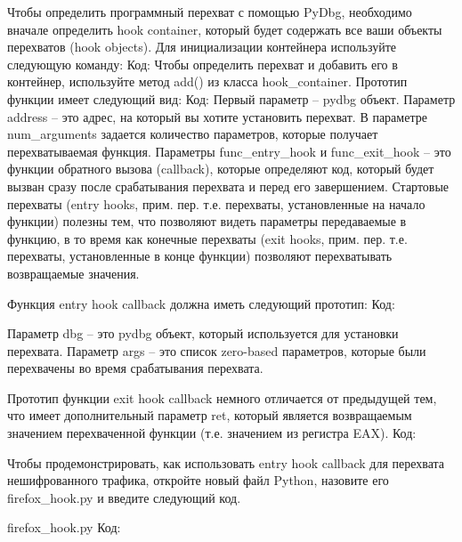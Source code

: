 \documentclass[12pt, a4paper, oneside]{book}
\begin{document}
Чтобы определить программный перехват с помощью PyDbg, необходимо вначале определить hook container, который будет содержать все ваши объекты перехватов (hook objects). Для инициализации контейнера используйте следующую команду:
Код:
Чтобы определить перехват и добавить его в контейнер, используйте метод add() из класса hook\_container. Прототип функции имеет следующий вид:
Код:
Первый параметр – pydbg объект. Параметр address – это адрес, на который вы хотите установить перехват. В параметре num\_arguments задается количество параметров, которые получает перехватываемая функция. Параметры func\_entry\_hook и func\_exit\_hook – это функции обратного вызова (callback), которые определяют код, который будет вызван сразу после срабатывания перехвата и перед его завершением. Стартовые перехваты (entry hooks, прим. пер. т.е. перехваты, установленные на начало функции) полезны тем, что позволяют видеть параметры передаваемые в функцию, в то время как конечные перехваты (exit hooks, прим. пер. т.е. перехваты, установленные в конце функции) позволяют перехватывать возвращаемые значения. 

Функция entry hook callback должна иметь следующий прототип:
Код:
    

Параметр dbg – это pydbg объект, который используется для установки перехвата. Параметр args – это список zero-based параметров, которые были перехвачены во время срабатывания перехвата.

Прототип функции exit hook callback немного отличается от предыдущей тем, что имеет дополнительный параметр ret, который является возвращаемым значением перехваченной функции (т.е. значением из регистра EAX).
Код:
    

Чтобы продемонстрировать, как использовать entry hook callback для перехвата нешифрованного трафика, откройте новый файл Python, назовите его firefox\_hook.py и введите следующий код.

firefox\_hook.py
Код:



\end{document}

